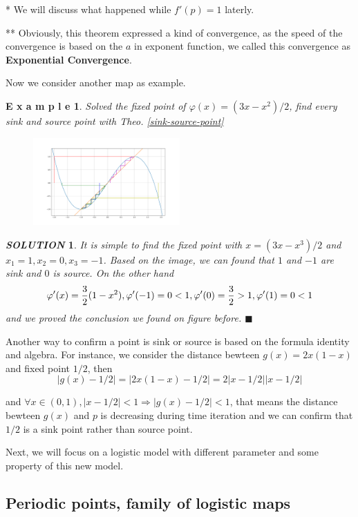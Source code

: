 \documentclass[12pt]{article}
\theoremstyle{plain}
\newtheorem{example}{\textbf{E x a m p l e}}[section]
\newtheorem{solution}{\textit{SOLUTION}}[section]
\begin{document}
* We will discuss what happened while $f'(p) = 1$ laterly.

** Obviously, this theorem expressed a kind of convergence, as the speed of the convergence is based on the $a$ in exponent function, we called this convergence as \textbf{Exponential Convergence}.

Now we consider another map as example.


\newpage
\begin{example} Solved the fixed point of $\varphi(x) = (3x -x^2)/2$, find every sink and source point with Theo. \ref{sink-source-point}
\end{example}


\begin{figure}[H]
\begin{center}
\includegraphics[width=0.5\textwidth]{figure/section1/cobweb-plot-2.png} \\
\end{center}
\end{figure}

{\color{blue}
\begin{solution}
It is simple to find the fixed point with $x = (3x - x^3) / 2$ and $x_1 = 1, x_2 = 0, x_3 = -1$. Based on the image, we can found that $1$ and $-1$ are sink and $0$ is source. On the other hand
$$
\varphi'(x) = {3\over 2} (1 - x^2), \varphi'(-1) = 0 < 1, \varphi'(0) = {3 \over 2} > 1, \varphi'(1) = 0 < 1
$$ 
and we proved the conclusion we found on figure before. $\blacksquare$
\end{solution}
}

Another way to confirm a point is sink or source is based on the formula identity and algebra. For instance, we consider the distance bewteen $g(x) = 2x(1-x)$ and fixed point $1/2$, then 
$$
|g(x) - 1/2| = |2x(1-x) - 1/2| = 2|x - 1/2||x - 1/2|
$$

and $\forall x \in (0, 1), |x - 1/2| < 1 \Rightarrow |g(x) - 1/2| < 1$, that means the distance bewteen $g(x)$ and $p$ is decreasing during time iteration and we can confirm that $1/2$ is a sink point rather than source point.

Next, we will focus on a logistic model with different parameter and some property of this new model.


\subsection{Periodic points, family of logistic maps}
\end{document}
